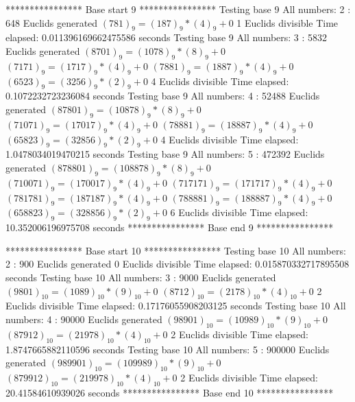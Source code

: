 **************** Base start 9 ****************
Testing base 9 All numbers: 2 :
	 648 Euclids generated
	$(781)_{9}=(187)_{9}*(4)_{9}+0$
	 1 Euclids divisible
Time elapsed: 0.011396169662475586 seconds
Testing base 9 All numbers: 3 :
	 5832 Euclids generated
	$(8701)_{9}=(1078)_{9}*(8)_{9}+0$
	$(7171)_{9}=(1717)_{9}*(4)_{9}+0$
	$(7881)_{9}=(1887)_{9}*(4)_{9}+0$
	$(6523)_{9}=(3256)_{9}*(2)_{9}+0$
	 4 Euclids divisible
Time elapsed: 0.1072232723236084 seconds
Testing base 9 All numbers: 4 :
	 52488 Euclids generated
	$(87801)_{9}=(10878)_{9}*(8)_{9}+0$
	$(71071)_{9}=(17017)_{9}*(4)_{9}+0$
	$(78881)_{9}=(18887)_{9}*(4)_{9}+0$
	$(65823)_{9}=(32856)_{9}*(2)_{9}+0$
	 4 Euclids divisible
Time elapsed: 1.0478034019470215 seconds
Testing base 9 All numbers: 5 :
	 472392 Euclids generated
	$(878801)_{9}=(108878)_{9}*(8)_{9}+0$
	$(710071)_{9}=(170017)_{9}*(4)_{9}+0$
	$(717171)_{9}=(171717)_{9}*(4)_{9}+0$
	$(781781)_{9}=(187187)_{9}*(4)_{9}+0$
	$(788881)_{9}=(188887)_{9}*(4)_{9}+0$
	$(658823)_{9}=(328856)_{9}*(2)_{9}+0$
	 6 Euclids divisible
Time elapsed: 10.352006196975708 seconds
**************** Base end 9 ****************

**************** Base start 10 ****************
Testing base 10 All numbers: 2 :
	 900 Euclids generated
	 0 Euclids divisible
Time elapsed: 0.015870332717895508 seconds
Testing base 10 All numbers: 3 :
	 9000 Euclids generated
	$(9801)_{10}=(1089)_{10}*(9)_{10}+0$
	$(8712)_{10}=(2178)_{10}*(4)_{10}+0$
	 2 Euclids divisible
Time elapsed: 0.17176055908203125 seconds
Testing base 10 All numbers: 4 :
	 90000 Euclids generated
	$(98901)_{10}=(10989)_{10}*(9)_{10}+0$
	$(87912)_{10}=(21978)_{10}*(4)_{10}+0$
	 2 Euclids divisible
Time elapsed: 1.8747665882110596 seconds
Testing base 10 All numbers: 5 :
	 900000 Euclids generated
	$(989901)_{10}=(109989)_{10}*(9)_{10}+0$
	$(879912)_{10}=(219978)_{10}*(4)_{10}+0$
	 2 Euclids divisible
Time elapsed: 20.41584610939026 seconds
**************** Base end 10 ****************

